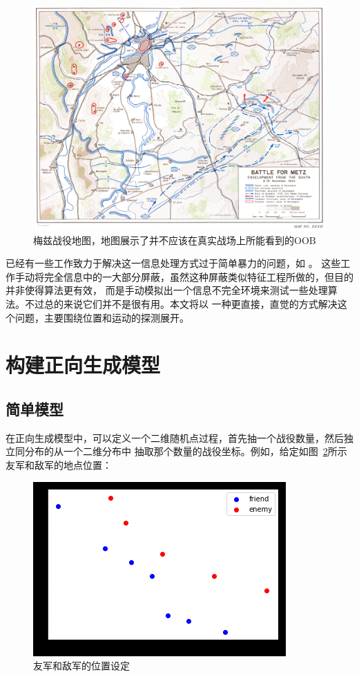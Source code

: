 \documentclass{sicnuthesis}
\begin{document}
\begin{figure}[htb]
\includegraphics[width=0.6\linewidth]{metz.jpg}
\caption{
梅兹战役地图，地图展示了并不应该在真实战场上所能看到的OOB }
\label{fig:metz}
\end{figure}



已经有一些工作致力于解决这一信息处理方式过于简单暴力的问题，如
\cite{hostetler2012inferring} \cite{vsmejkal2016integrating} \cite{touhou}。
这些工作手动将完全信息中的一大部分屏蔽，虽然这种屏蔽类似特征工程所做的，但目的并非使得算法更有效，
而是手动模拟出一个信息不完全环境来测试一些处理算法。不过总的来说它们并不是很有用。本文将以
一种更直接，直觉的方式解决这个问题，主要围绕位置和运动的探测展开。

\section{构建正向生成模型}

\subsection{简单模型}

在正向生成模型中，可以定义一个二维随机点过程，首先抽一个战役数量，然后独立同分布的从一个二维分布中
抽取那个数量的战役坐标。例如，给定如图~\ref{fig:stateNoBattle}所示友军和敌军的地点位置：

\begin{figure}[htb]
\includegraphics{state_no_battle.png}
\caption{
友军和敌军的位置设定}
\label{fig:stateNoBattle}
\end{figure}
\end{document}
